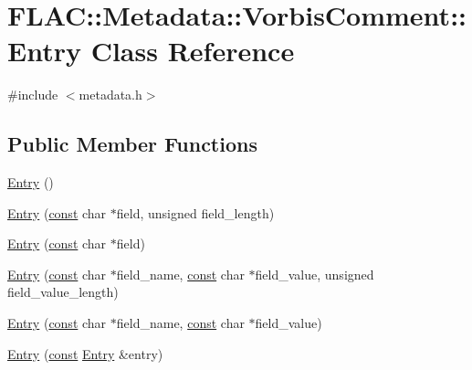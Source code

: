 \hypertarget{class_f_l_a_c_1_1_metadata_1_1_vorbis_comment_1_1_entry}{}\section{F\+L\+AC\+:\+:Metadata\+:\+:Vorbis\+Comment\+:\+:Entry Class Reference}
\label{class_f_l_a_c_1_1_metadata_1_1_vorbis_comment_1_1_entry}


{\ttfamily \#include $<$metadata.\+h$>$}

\subsection*{Public Member Functions}
\begin{DoxyCompactItemize}
\item 
\hyperlink{class_f_l_a_c_1_1_metadata_1_1_vorbis_comment_1_1_entry_a5674408447ce7678679816208cb2e2f1}{Entry} ()
\item 
\hyperlink{class_f_l_a_c_1_1_metadata_1_1_vorbis_comment_1_1_entry_a43d1330269f225f2e0236a31801477bb}{Entry} (\hyperlink{getopt1_8c_a2c212835823e3c54a8ab6d95c652660e}{const} char $\ast$field, unsigned field\+\_\+length)
\item 
\hyperlink{class_f_l_a_c_1_1_metadata_1_1_vorbis_comment_1_1_entry_a221ad4f9d3819d5ef325b29ade3b3eff}{Entry} (\hyperlink{getopt1_8c_a2c212835823e3c54a8ab6d95c652660e}{const} char $\ast$field)
\item 
\hyperlink{class_f_l_a_c_1_1_metadata_1_1_vorbis_comment_1_1_entry_a150f13955a241de4a9dac2946a3b822d}{Entry} (\hyperlink{getopt1_8c_a2c212835823e3c54a8ab6d95c652660e}{const} char $\ast$field\+\_\+name, \hyperlink{getopt1_8c_a2c212835823e3c54a8ab6d95c652660e}{const} char $\ast$field\+\_\+value, unsigned field\+\_\+value\+\_\+length)
\item 
\hyperlink{class_f_l_a_c_1_1_metadata_1_1_vorbis_comment_1_1_entry_a7b7c67cff4a99929362b90080a597f6b}{Entry} (\hyperlink{getopt1_8c_a2c212835823e3c54a8ab6d95c652660e}{const} char $\ast$field\+\_\+name, \hyperlink{getopt1_8c_a2c212835823e3c54a8ab6d95c652660e}{const} char $\ast$field\+\_\+value)
\item 
\hyperlink{class_f_l_a_c_1_1_metadata_1_1_vorbis_comment_1_1_entry_a12bdf740bf24026a559e82585eb31390}{Entry} (\hyperlink{getopt1_8c_a2c212835823e3c54a8ab6d95c652660e}{const} \hyperlink{class_f_l_a_c_1_1_metadata_1_1_vorbis_comment_1_1_entry}{Entry} \&entry)
\item 

\end{DoxyCompactItemize}
